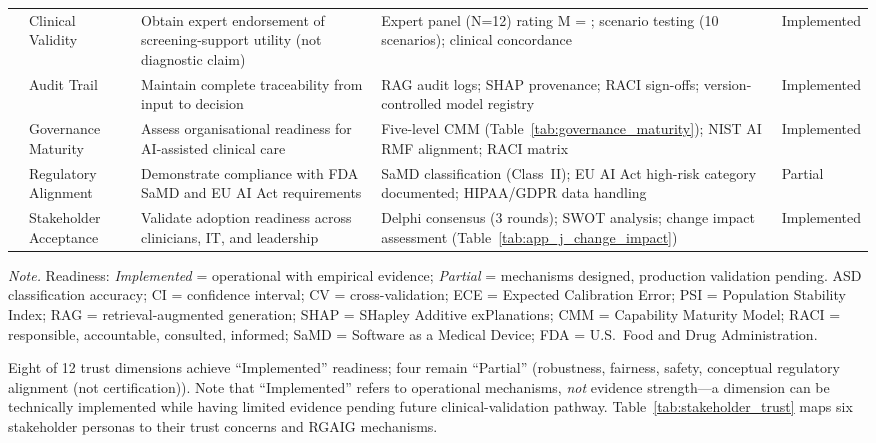 \begin{table}[!htbp]
\begin{tabularx}{\textwidth}{@{} p{0.4cm} >{\raggedright\arraybackslash}p{1.6cm} L L >{\raggedright\arraybackslash}p{1.6cm} @{}}
 & Clinical Validity & Obtain expert endorsement of screening-support utility (not diagnostic claim) & Expert panel (N=12) rating M = \expertM{}; scenario testing (10 scenarios); clinical concordance & Implemented \\
 & Audit Trail & Maintain complete traceability from input to decision & RAG audit logs; SHAP provenance; RACI sign-offs; version-controlled model registry & Implemented \\
 & Governance Maturity & Assess organisational readiness for AI-assisted clinical care & Five-level CMM (Table~\ref{tab:governance_maturity}); NIST AI RMF alignment; RACI matrix & Implemented \\
 & Regulatory Alignment & Demonstrate compliance with FDA SaMD and EU AI Act requirements & SaMD classification (Class~II); EU AI Act high-risk category documented; HIPAA/GDPR data handling & Partial \\
 & Stakeholder Acceptance & Validate adoption readiness across clinicians, IT, and leadership & Delphi consensus (3 rounds); SWOT analysis; change impact assessment (Table~\ref{tab:app_j_change_impact}) & Implemented \\
\bottomrule
\end{tabularx}
\vspace{0.5em}\noindent\textit{Note.} Readiness: \textit{Implemented} = operational with empirical evidence; \textit{Partial} = mechanisms designed, production validation pending. ASD classification accuracy; CI = confidence interval; CV = cross-validation; ECE = Expected Calibration Error; PSI = Population Stability Index; RAG = retrieval-augmented generation; SHAP = SHapley Additive exPlanations; CMM = Capability Maturity Model; RACI = responsible, accountable, consulted, informed; SaMD = Software as a Medical Device; FDA = U.S.\ Food and Drug Administration.
\end{table}

\noindent Eight of 12 trust dimensions achieve ``Implemented'' readiness; four remain ``Partial'' (robustness, fairness, safety, conceptual regulatory alignment (not certification)). Note that ``Implemented'' refers to operational mechanisms, \textit{not} evidence strength---a dimension can be technically implemented while having limited evidence pending future clinical-validation pathway. Table~\ref{tab:stakeholder_trust} maps six stakeholder personas to their trust concerns and RGAIG mechanisms.

